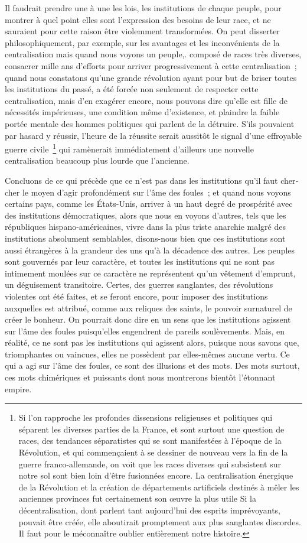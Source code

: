 \documentclass[french,twoside]{book} %
\begin{document}
Il faudrait prendre une à une les lois, les institutions de chaque peuple, pour mon­trer à quel point elles sont l’expression des besoins de leur race, et ne sauraient pour cette raison être violemment transformées. On peut disserter philosophiquement, par exemple, sur les avantages et les inconvénients de la centralisation mais quand nous voyons un peuple,. composé de races très diverses, consacrer mille ans d’efforts pour arriver progressivement à cette centralisation ; quand nous constatons qu’une grande révolution ayant pour but de briser toutes les institutions du passé, a été forcée non seulement de respecter cette centralisation, mais d’en exagérer encore, nous pouvons dire qu’elle est fille de nécessités impérieuses, une condition même d’existence, et plaindre la faible portée mentale des hommes politiques qui parlent de la détruire. S’ils pouvaient par hasard y réussir, l’heure de la réussite serait aussitôt le signal d’une effroyable guerre civile \footnote{Si l’on rapproche les profondes dissensions religieuses et politiques qui séparent les diverses parties de la France, et sont surtout une question de races, des tendances séparatistes qui se sont manifestées à l’époque de la Révolution, et qui commençaient à se dessiner de nouveau vers la fin de la guerre franco-allemande, on voit que les races diverses qui subsistent sur notre sol sont bien loin d’être fusionnées encore. La centralisation énergique de la Révolution et la création de départements artificiels destinés à mêler les anciennes provinces fut certainement son œuvre la plus utile Si la décentralisation, dont parlent tant aujourd’hui des esprits imprévoyants, pouvait être créée, elle aboutirait promptement aux plus sanglantes discordes. Il faut pour le méconnaître oublier entièrement notre histoire.} qui ramènerait immédiatement d’ailleurs une nouvelle centralisation beaucoup plus lourde que l’ancienne.\par
Concluons de ce qui précède que ce n’est pas dans les institutions qu’il faut cher­cher le moyen d’agir profondément sur l’âme des foules ; et quand nous voyons cer­tains pays, comme les États-Unis, arriver à un haut degré de prospérité avec des institutions démocratiques, alors que nous en voyons d’autres, tels que les républi­ques hispano-américaines, vivre dans la plus triste anarchie malgré des institutions absolument semblables, disons-nous bien que ces institutions sont aussi étrangères à la grandeur des uns qu’à la décadence des autres. Les peuples sont gouvernés par leur caractère, et toutes les institutions qui ne sont pas intimement moulées sur ce carac­tère ne représentent qu’un vêtement d’emprunt, un déguisement transitoire. Certes, des guerres sanglantes, des révolutions violentes ont été faites, et se feront encore, pour imposer des institutions auxquelles est attribué, comme aux reliques des saints, le pouvoir surnaturel de créer le bonheur. On pourrait donc dire en un sens que les insti­tutions agissent sur l’âme des foules puisqu’elles engendrent de pareils soulèvements. Mais, en réalité, ce ne sont pas les institutions qui agissent alors, puisque nous savons que, triomphantes ou vaincues, elles ne possèdent par elles-mêmes aucune vertu. Ce qui a agi sur l’âme des foules, ce sont des illusions et des mots. Des mots surtout, ces mots chimériques et puissants dont nous montrerons bientôt l’étonnant empire.
\end{document}
